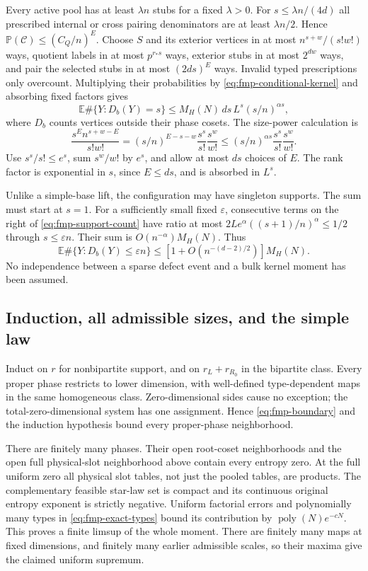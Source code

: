 Every active pool has at least $\lambda n$ stubs for a fixed
$\lambda>0$. For $s\le\lambda n/(4d)$ all prescribed internal or
cross pairing denominators are at least $\lambda n/2$. Hence
$\mathbb P(\mathcal C)\le(C_Q/n)^E$. Choose $S$ and its exterior
vertices in at most $n^{s+w}/(s!w!)$ ways, quotient labels in at most
$p^{r_*s}$ ways, exterior stubs in at most $2^{dw}$ ways, and pair
the selected stubs in at most $(2ds)^E$ ways. Invalid typed
prescriptions only overcount. Multiplying their probabilities by
\eqref{eq:fmp-conditional-kernel} and absorbing fixed factors gives
\begin{equation}\label{eq:fmp-support-count}
 \mathbb E\#\{Y:D_b(Y)=s\}
 \le M_H(N)\,ds\,L^s(s/n)^{\alpha s},
\end{equation}
where $D_b$ counts vertices outside their phase cosets. The size-power
calculation is
\[
 \frac{s^E n^{s+w-E}}{s!w!}
 =(s/n)^{E-s-w}\frac{s^s}{s!}\frac{s^w}{w!}
 \le(s/n)^{\alpha s}\frac{s^s}{s!}\frac{s^w}{w!}.
\]
Use $s^s/s!\le e^s$, sum $s^w/w!$ by $e^s$, and allow at most $ds$
choices of $E$. The rank factor is exponential in $s$, since $E\le ds$,
and is absorbed in $L^s$.

Unlike a simple-base lift, the configuration may have singleton
supports. The sum must start at $s=1$. For a sufficiently small
fixed $\varepsilon$, consecutive terms on the right of
\eqref{eq:fmp-support-count} have ratio at most
$2Le^\alpha((s+1)/n)^\alpha\le1/2$ through $s\le\varepsilon n$.
Their sum is $O(n^{-\alpha})M_H(N)$. Thus
\begin{equation}\label{eq:fmp-boundary}
 \mathbb E\#\{Y:D_b(Y)\le\varepsilon n\}
             \le[1+O(n^{-(d-2)/2})]M_H(N).
\end{equation}
No independence between a sparse defect event and a bulk kernel
moment has been assumed.

\subsection{Induction, all admissible sizes, and the simple law}
Induct on $r$ for nonbipartite support, and on $r_L+r_{R_0}$ in
the bipartite class. Every proper phase restricts to lower dimension,
with well-defined type-dependent maps in the same homogeneous class.
Zero-dimensional sides cause no exception; the total-zero-dimensional
system has one assignment. Hence \eqref{eq:fmp-boundary} and the
induction hypothesis bound every proper-phase neighborhood.

There are finitely many phases. Their open root-coset neighborhoods
and the open full physical-slot neighborhood above contain every
entropy zero. At the full uniform zero all physical slot tables,
not just the pooled tables, are products. The complementary feasible
star-law set is compact and its continuous original entropy exponent
is strictly negative. Uniform factorial errors and polynomially many
types in \eqref{eq:fmp-exact-types} bound its contribution by
$\operatorname{poly}(N)e^{-cN}$. This proves a finite limsup of the
whole moment. There are finitely many maps at fixed dimensions, and
finitely many earlier admissible scales, so their maxima give the
claimed uniform supremum.


